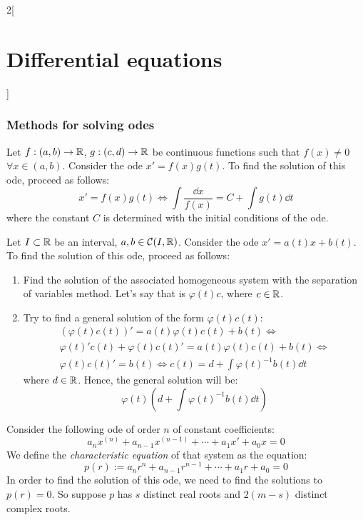 \documentclass[../../../main.tex]{subfiles}
\begin{document}
\begin{multicols}{2}[\section{Differential equations}]
  \subsubsection{Methods for solving odes}
  \begin{method}
    Let $f:(a,b)\rightarrow\mathbb{R}$, $g:(c,d)\rightarrow\mathbb{R}$ be continuous functions such that $f(x)\ne 0$ $\forall x\in (a,b)$. Consider the ode $x'=f(x)g(t)$. To find the solution of this ode, proceed as follows:
    $$x'=f(x)g(t)\iff \int\frac{\dd{x}}{f(x)}=C+\int g(t)\dd{t}$$ where the constant $C$ is determined with the initial conditions of the ode.
  \end{method}
  \begin{method}
    Let $I\subset \mathbb{R}$ be an interval, $a,b\in\mathcal{C}(I,\mathbb{R})$. Consider the ode $x'=a(t)x+b(t)$. To find the solution of this ode, proceed as follows:
    \begin{enumerate}
      \item Find the solution of the associated homogeneous system with the separation of variables method. Let's say that is $\varphi(t)c$, where $c\in\mathbb{R}$.
      \item Try to find a general solution of the form $\varphi(t)c(t)$:
            \begin{multline*}
              \left(\varphi(t)c(t)\right)'=a(t)\varphi(t)c(t)+b(t)\iff\\\varphi(t)'c(t)+\varphi(t)c(t)'=a(t)\varphi(t)c(t)+b(t)\iff\\\varphi(t)c(t)'=b(t)\iff c(t)=d+\int\varphi(t)^{-1}b(t)\dd{t}
            \end{multline*}
            where $d\in\mathbb{R}$. Hence, the general solution will be: $$\varphi(t)\left(d+\int\varphi(t)^{-1}b(t)\dd{t}\right)$$
    \end{enumerate}
  \end{method}
  \begin{method}
    Consider the following ode of order $n$ of constant coefficients:
    \begin{equation}\label{DE_char}
      a_n x^{(n)} + a_{n-1}x^{(n-1)} + \cdots + a_1 x' + a_0 x = 0
    \end{equation}
    We define the \emph{characteristic equation} of that system as the equation: $$p(r):=a_n r^n + a_{n-1}r^{n-1} + \cdots + a_1 r + a_0 = 0$$
    In order to find the solution of this ode, we need to find the solutions to $p(r)=0$. So suppose $p$ has $s$ distinct real roots and $2(m-s)$ distinct complex roots.

\end{method}
\end{multicols}
\end{document}
